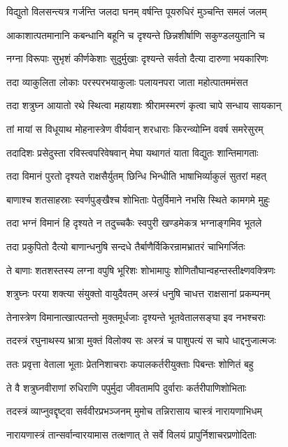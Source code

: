 \twolineshloka
{विद्युतो विलसन्त्यत्र गर्जन्ति जलदा घनम्}
{वर्षन्ति पूयरुधिरं मुञ्चन्ति समलं जलम्}%

\twolineshloka
{आकाशात्पतमानानि कबन्धानि बहूनि च}
{दृश्यन्ते छिन्नशीर्षाणि सकुण्डलयुतानि च}%

\twolineshloka
{नग्ना विरूपाः सुभृशं कीर्णकेशाः सुदुर्मुखाः}
{दृश्यन्ते सर्वतो दैत्या दारुणा भयकारिणः}%

\twolineshloka
{तदा व्याकुलिता लोकाः परस्परभयाकुलाः}
{पलायनपरा जाता महोत्पातममंसत}%

\twolineshloka
{तदा शत्रुघ्न आयातो रथे स्थित्वा महायशाः}
{श्रीरामस्मरणं कृत्वा चापे सन्धाय सायकान्}%

\twolineshloka
{तां मायां स विधूयाथ मोहनास्त्रेण वीर्यवान्}
{शरधाराः किरन्व्योम्नि ववर्ष समरेसुरम्}%

\twolineshloka
{तदादिशः प्रसेदुस्ता रविस्त्वपरिवेषवान्}
{मेघा यथागतं याता विद्युतः शान्तिमागताः}%

\twolineshloka
{तदा विमानं पुरतो दृश्यते राक्षसैर्युतम्}
{छिन्धि भिन्धीति भाषाभिर्व्याकुलं सुतरां महत्}%

\twolineshloka
{बाणाश्च शतसाहस्राः स्वर्णपुङ्खैश्च शोभिताः}
{पेतुर्विमाने नभसि स्थिते कामगमे मुहुः}%

\twolineshloka
{तदा भग्नं विमानं हि दृश्यते न तदुच्चकैः}
{स्वपुरी खण्डमेकत्र भग्नाङ्गमिव भूतले}%

\twolineshloka
{तदा प्रकुपितो दैत्यो बाणान्धनुषि सन्दधे}
{तैर्बाणैर्विकिरन्रामभ्रातरं चाभिगर्जितः}%

\twolineshloka
{ते बाणाः शतशस्तस्य लग्ना वपुषि भूरिशः}
{शोभामापुः शोणितौघान्वहन्तस्तीक्ष्णवक्त्रिणः}%

\twolineshloka
{शत्रुघ्नः परया शक्त्या संयुक्तो वायुदैवतम्}
{अस्त्रं धनुषि चाधत्त राक्षसानां प्रकम्पनम्}%

\twolineshloka
{तेनास्त्रेण विमानात्खात्पतन्तो मुक्तमूर्धजाः}
{दृश्यन्ते भूतवेतालसङ्घा इव नभश्चराः}%

\twolineshloka
{तदस्त्रं रघुनाथस्य भ्रात्रा मुक्तं विलोक्य सः}
{अस्त्रं च पाशुपत्यं स चापे धाद्दनुजात्मजः}%

\twolineshloka
{ततः प्रवृत्ता वेताला भूताः प्रेतनिशाचराः}
{कपालकर्तरीयुक्ताः पिबन्तः शोणितं बहु}%

\twolineshloka
{ते वै शत्रुघ्नवीराणां रुधिराणि पपुर्मुदा}
{जीवतामपि दुर्वाराः कर्तरीपाणिशोभिताः}%

\twolineshloka
{तदस्त्रं व्याप्नुवद्दृष्ट्वा सर्ववीरप्रभञ्जनम्}
{मुमोच तन्निरासाय चास्त्रं नारायणाभिधम्}%

\twolineshloka
{नारायणास्त्रं तान्सर्वान्वारयामास तत्क्षणात्}
{ते सर्वे विलयं प्रापुर्निशाचरप्रणोदिताः}%

